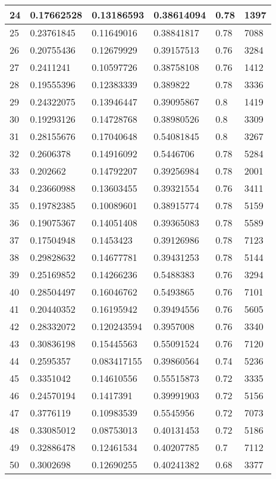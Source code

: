 \begin{longtable}{|l|l|l|l|l|l|}
24 & 0.17662528 & 0.13186593 & 0.38614094 & 0.78 & 1397 \\ \hline 
25 & 0.23761845 & 0.11649016 & 0.38841817 & 0.78 & 7088 \\ \hline 
26 & 0.20755436 & 0.12679929 & 0.39157513 & 0.76 & 3284 \\ \hline 
27 & 0.2411241 & 0.10597726 & 0.38758108 & 0.76 & 1412 \\ \hline 
28 & 0.19555396 & 0.12383339 & 0.389822 & 0.78 & 3336 \\ \hline 
29 & 0.24322075 & 0.13946447 & 0.39095867 & 0.8 & 1419 \\ \hline 
30 & 0.19293126 & 0.14728768 & 0.38980526 & 0.8 & 3309 \\ \hline 
31 & 0.28155676 & 0.17040648 & 0.54081845 & 0.8 & 3267 \\ \hline 
32 & 0.2606378 & 0.14916092 & 0.5446706 & 0.78 & 5284 \\ \hline 
33 & 0.202662 & 0.14792207 & 0.39256984 & 0.78 & 2001 \\ \hline 
34 & 0.23660988 & 0.13603455 & 0.39321554 & 0.76 & 3411 \\ \hline 
35 & 0.19782385 & 0.10089601 & 0.38915774 & 0.78 & 5159 \\ \hline 
36 & 0.19075367 & 0.14051408 & 0.39365083 & 0.78 & 5589 \\ \hline 
37 & 0.17504948 & 0.1453423 & 0.39126986 & 0.78 & 7123 \\ \hline 
38 & 0.29828632 & 0.14677781 & 0.39431253 & 0.78 & 5144 \\ \hline 
39 & 0.25169852 & 0.14266236 & 0.5488383 & 0.76 & 3294 \\ \hline 
40 & 0.28504497 & 0.16046762 & 0.5493865 & 0.76 & 7101 \\ \hline 
41 & 0.20440352 & 0.16195942 & 0.39494556 & 0.76 & 5605 \\ \hline 
42 & 0.28332072 & 0.120243594 & 0.3957008 & 0.76 & 3340 \\ \hline 
43 & 0.30836198 & 0.15445563 & 0.55091524 & 0.76 & 7120 \\ \hline 
44 & 0.2595357 & 0.083417155 & 0.39860564 & 0.74 & 5236 \\ \hline 
45 & 0.3351042 & 0.14610556 & 0.55515873 & 0.72 & 3335 \\ \hline 
46 & 0.24570194 & 0.1417391 & 0.39991903 & 0.72 & 5156 \\ \hline 
47 & 0.3776119 & 0.10983539 & 0.5545956 & 0.72 & 7073 \\ \hline 
48 & 0.33085012 & 0.08753013 & 0.40131453 & 0.72 & 5186 \\ \hline 
49 & 0.32886478 & 0.12461534 & 0.40207785 & 0.7 & 7112 \\ \hline 
50 & 0.3002698 & 0.12690255 & 0.40241382 & 0.68 & 3377 \\ \hline 
\end{longtable}